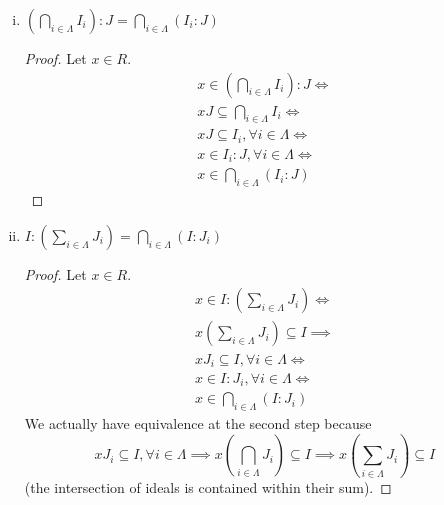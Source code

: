 \begin{problem*}{5}
\begin{enumerate}[(i)]
    \item \(\left(\bigcap_{i \in \Lambda} I_i\right) : J = \bigcap_{i \in \Lambda} \left(I_i : J\right)\)
    \begin{proof}
    Let \(x \in R\).
    \begin{gather*}
        x \in \left(\bigcap_{i \in \Lambda} I_i\right) : J \iff \\
        x J \subseteq \bigcap_{i \in \Lambda} I_i \iff \\
        x J \subseteq I_i, \forall i \in \Lambda \iff \\
        x \in I_i : J, \forall i \in \Lambda \iff \\
        x \in \bigcap_{i \in \Lambda} (I_i : J)
    \end{gather*}
    \end{proof}
    
    \item \(I : \left(\sum_{i \in \Lambda} J_i\right) = \bigcap_{i \in \Lambda} \left(I : J_i\right)\)
    \begin{proof}
    Let \(x \in R\).
    \begin{gather*}
        x \in I : \left(\sum_{i \in \Lambda} J_i\right) \iff \\
        x \left(\sum_{i \in \Lambda} J_i\right) \subseteq I \implies \\
        x J_i \subseteq I, \forall i \in \Lambda \iff \\
        x \in I : J_i, \forall i \in \Lambda \iff \\
        x \in \bigcap_{i \in \Lambda} \left(I : J_i\right)
    \end{gather*}
    We actually have equivalence at the second step because
    \[
        x J_i \subseteq I, \forall i \in \Lambda
        \implies
        x \left(\bigcap_{i \in \Lambda} J_i \right) \subseteq I
        \implies
        x \left(\sum_{i \in \Lambda} J_i\right) \subseteq I
    \]
    (the intersection of ideals is contained within their sum).
    \end{proof}
\end{enumerate}
\end{problem*}

